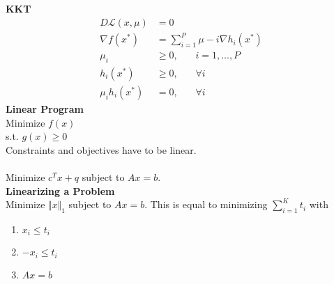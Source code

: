 \documentclass[12pt,a4paper]{report}
\begin{document}
\textbf{KKT}
\begin{align*}
D\mathcal{L}(x,\mu)&=0\\
\nabla f(x^*)&=\sum_{i=1}^P\mu-i\nabla h_i(x^*)\\
\mu_i&\geq0,\phantom{mm}i=1,\ldots,P\\
h_i(x^*)&\geq0,\phantom{mm}\forall i\\
\mu_ih_i(x^*)&=0,\phantom{mm}\forall i
\end{align*}
\textbf{Linear Program}\\
Minimize $f(x)$\\
s.t. $g(x)\geq0$\\
Constraints and objectives have to be linear.\\\\
Minimize $c^Tx+q$ subject to $Ax=b$.\\
\textbf{Linearizing a Problem}\\
Minimize $\Vert x\Vert_1$ subject to $Ax=b$. This is equal to minimizing $\sum_{i=1}^Kt_i$ with
\begin{enumerate}
\item $x_i\leq t_i$
\item $-x_i\leq t_i$
\item $Ax=b$
\end{enumerate}
\end{document}
